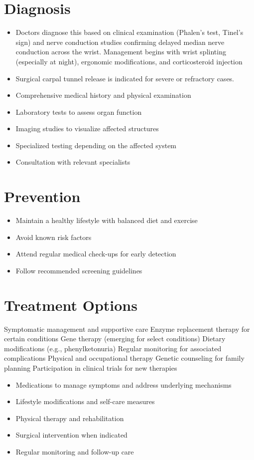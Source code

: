 \section{Diagnosis}
\begin{itemize}[noitemsep]
  \item Doctors diagnose this based on clinical examination (Phalen's test, Tinel's sign) and nerve conduction studies confirming delayed median nerve conduction across the wrist. Management begins with wrist splinting (especially at night), ergonomic modifications, and corticosteroid injection
  \item Surgical carpal tunnel release is indicated for severe or refractory cases.
  \item Comprehensive medical history and physical examination
  \item Laboratory tests to assess organ function
  \item Imaging studies to visualize affected structures
  \item Specialized testing depending on the affected system
  \item Consultation with relevant specialists
\end{itemize}
\section{Prevention}
\begin{itemize}[noitemsep]
  \item Maintain a healthy lifestyle with balanced diet and exercise
  \item Avoid known risk factors
  \item Attend regular medical check-ups for early detection
  \item Follow recommended screening guidelines
\end{itemize}
\section{Treatment Options}
Symptomatic management and supportive care Enzyme replacement therapy for certain conditions Gene therapy (emerging for select conditions) Dietary modifications (e.g., phenylketonuria) Regular monitoring for associated complications Physical and occupational therapy Genetic counseling for family planning Participation in clinical trials for new therapies

\begin{itemize}[noitemsep]
  \item Medications to manage symptoms and address underlying mechanisms
  \item Lifestyle modifications and self-care measures
  \item Physical therapy and rehabilitation
  \item Surgical intervention when indicated
  \item Regular monitoring and follow-up care
\end{itemize}
